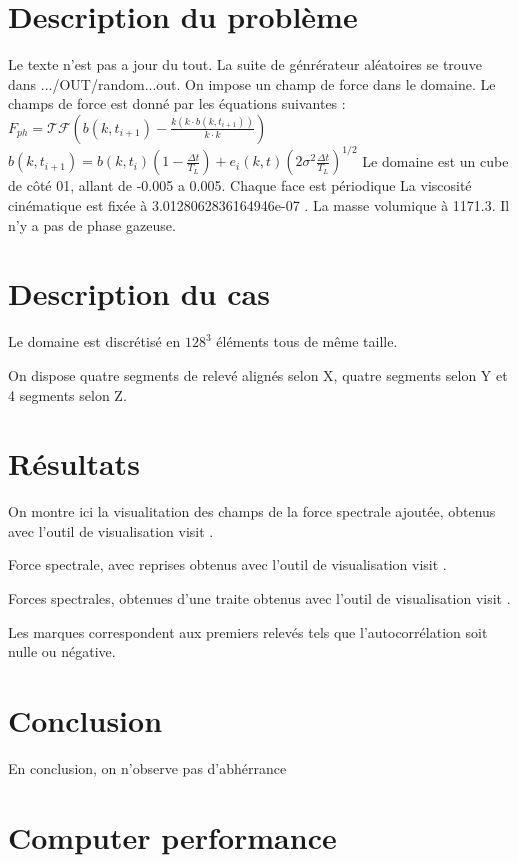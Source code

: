 \section{Description du probl\`{e}me}
Le texte n'est pas a jour du tout. La suite de g\'{e}nr\'{e}rateur al\'{e}atoires se trouve dans .../OUT/random...out.
On impose un champ de force dans le domaine. Le champs de force est donn\'{e} par les \'{e}quations suivantes : 
 $F_{ph} = \mathcal{TF}(b(k,t_{i+1}) - \frac{k(k \cdot b(k, t_{i+1}))}{k \cdot k})$ 
$ b(k,t_{i+1}) = b(k,t_i)(1-\frac{\Delta t}{T_L}) + e_i(k,t) (2\sigma^2 \frac{\Delta t}{T_L})^{1/2}$
Le domaine est un cube de c\^{o}t\'{e} 01, allant de -0.005 a  0.005.
Chaque face est p\'{e}riodique
La viscosit\'{e} cin\'{e}matique est fix\'{e}e \`{a} 3.0128062836164946e-07 . La masse volumique \`{a} 1171.3. Il n'y a pas de phase gazeuse.


\section{Description du cas}
Le domaine est discr\'{e}tis\'{e} en $128^3$ \'{e}l\'{e}ments tous de m\^{e}me taille.

 On dispose quatre segments de relev\'{e} align\'{e}s selon X, quatre segments selon Y et 4 segments selon Z. 

\section{R\'{e}sultats}
On montre ici la visualitation des champs de la force spectrale ajout\'{e}e,
 obtenus avec l'outil de visualisation visit .


Force spectrale, avec reprises
 obtenus avec l'outil de visualisation visit .


Forces spectrales, obtenues d'une traite
 obtenus avec l'outil de visualisation visit .


Les marques correspondent aux premiers relev\'{e}s tels que l'autocorr\'{e}lation soit nulle ou n\'{e}gative.
     


\section{Conclusion}
En conclusion, on n'observe pas d'abh\'{e}rrance

\section{Computer performance}



